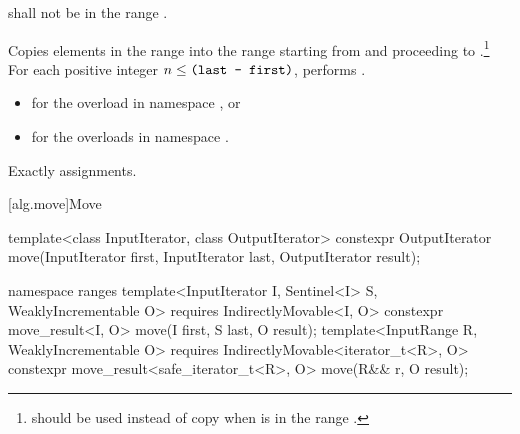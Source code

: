 \begin{itemdescr}
\pnum
\requires
{}
shall not be in the range
.

\pnum
\effects
Copies elements in the range 
into the
range 
starting from
and proceeding to .\footnote{
should be used instead of copy when 
is in
the range
.}
For each positive integer
$n \le \texttt{(last - first)}$,
performs
.

\pnum
\returns
\begin{itemize}
\item {}
  for the overload in namespace , or
\item {}
  for the overloads in namespace .
\end{itemize}

\pnum
\complexity
Exactly
assignments.
\end{itemdescr}

[alg.move]{Move}

%
\begin{itemdecl}
template<class InputIterator, class OutputIterator>
  constexpr OutputIterator move(InputIterator first, InputIterator last,
                                OutputIterator result);

namespace ranges {
  template<InputIterator I, Sentinel<I> S, WeaklyIncrementable O>
    requires IndirectlyMovable<I, O>
    constexpr move_result<I, O>
      move(I first, S last, O result);
  template<InputRange R, WeaklyIncrementable O>
    requires IndirectlyMovable<iterator_t<R>, O>
    constexpr move_result<safe_iterator_t<R>, O>
      move(R&& r, O result);
}
\end{itemdecl}

